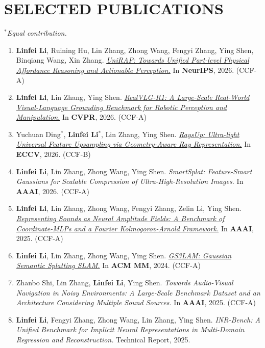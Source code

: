 \documentclass[11pt,a4paper]{article}
\begin{document}
\section{SELECTED PUBLICATIONS}
\textit{$^*$Equal contribution.}
\begin{enumerate}[label=\arabic*.]
  \item \textbf{Linfei Li}, Ruining Hu, Lin Zhang, Zhong Wang, Fengyi Zhang, Ying Shen, Binqiang Wang, Xin Zhang. \href{https://lif314.github.io/projects/unirap/}{\textit{UniRAP: Towards Unified Part-level Physical Affordance Reasoning and Actionable Perception.}} In \textbf{NeurIPS}, 2026. (CCF-A)

  \item \textbf{Linfei Li}, Lin Zhang, Ying Shen. \href{https://lif314.github.io/projects/realvlg_r1/}{\textit{RealVLG-R1: A Large-Scale Real-World Visual-Language Grounding Benchmark for Robotic Perception and Manipulation.}} In \textbf{CVPR}, 2026. (CCF-A)

  \item Yuchuan Ding$^*$, \textbf{Linfei Li}$^*$, Lin Zhang, Ying Shen. \href{https://lif314.github.io/projects/raysup/}{\textit{RaysUp: Ultra-light Universal Feature Upsampling via Geometry-Aware Ray Representation.}} In \textbf{ECCV}, 2026. (CCF-B)

  \item \textbf{Linfei Li}, Lin Zhang, Zhong Wang, Ying Shen. \textit{SmartSplat: Feature-Smart Gaussians for Scalable Compression of Ultra-High-Resolution Images.} In \textbf{AAAI}, 2026. (CCF-A)

  \item \textbf{Linfei Li}, Lin Zhang, Zhong Wang, Fengyi Zhang, Zelin Li, Ying Shen. \href{https://lif314.github.io/projects/neaf/}{\textit{Representing Sounds as Neural Amplitude Fields: A Benchmark of Coordinate-MLPs and a Fourier Kolmogorov-Arnold Framework.}} In \textbf{AAAI}, 2025. (CCF-A)

  \item \textbf{Linfei Li}, Lin Zhang, Zhong Wang, Ying Shen. \href{https://lif314.github.io/projects/gs3lam/}{\textit{GS3LAM: Gaussian Semantic Splatting SLAM.}} In \textbf{ACM MM}, 2024. (CCF-A)

  \item Zhanbo Shi, Lin Zhang, \textbf{Linfei Li}, Ying Shen. \textit{Towards Audio-Visual Navigation in Noisy Environments: A Large-Scale Benchmark Dataset and an Architecture Considering Multiple Sound Sources.} In \textbf{AAAI}, 2025. (CCF-A)

  \item \textbf{Linfei Li}, Fengyi Zhang, Zhong Wang, Lin Zhang, Ying Shen. \textit{INR-Bench: A Unified Benchmark for Implicit Neural Representations in Multi-Domain Regression and Reconstruction.} Technical Report, 2025.
\end{enumerate}
\end{document}
